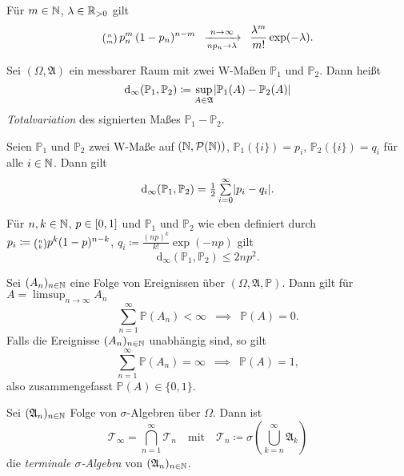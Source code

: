 \documentclass{cheat-sheet}
\newcommand{\Alg}{\mathfrak{A}} %
\renewcommand{\P}{\mathbb{P}} %
\let\myBinom\binom
\renewcommand{\binom}[2]{\mathsmaller{\myBinom{#1}{#2}}}
\begin{document}

\begin{satz}
  Für $m \in \mathbb{N}$, $\lambda \in \mathbb{R}_{>0}$ gilt
  \[ \binom{n}{m} \, p_n^m \, (1-p_n)^{n-m} \enspace \xrightarrow[n p_n \to \lambda]{n \to \infty} \enspace \frac{\lambda^m}{m!} \exp(-\lambda). \]
\end{satz}



\begin{defn}
  Sei $(\Omega, \Alg)$ ein messbarer Raum mit zwei W-Maßen $\P_1$ und $\P_2$. Dann heißt
  \[ \mathrm{d}_\infty(\P_1, \P_2) \coloneqq \sup_{A \in \Alg} \abs{\P_1(A) - \P_2(A)} \]
  \emph{Totalvariation} des signierten Maßes $\P_1 - \P_2$.
\end{defn}

\begin{satz}
  Seien $\P_1$ und $\P_2$ zwei W-Maße auf $(\mathbb{N}, \mathcal{P}(\mathbb{N}))$, $\P_1(\{ i \}) = p_i$, $\P_2(\{ i \}) = q_i$ für alle $i \in \mathbb{N}$. Dann gilt
  \[ \mathrm{d}_\infty(\P_1, \P_2) = \tfrac{1}{2} \sum_{i=0}^\infty \abs{p_i - q_i}. \]
\end{satz}

\begin{lem}
  Für $n, k \in \mathbb{N}$, $p \in \left[ 0, 1 \right]$ und $\P_1$ und $\P_2$ wie eben definiert durch $p_i \coloneqq \binom{n}{k} p^k (1-p)^{n-k}$, $q_i \coloneqq \tfrac{(np)^k}{k!} \exp(-np)$ gilt
  \[ \mathrm{d}_\infty(\P_1, \P_2) \leq 2 n p^2. \]
\end{lem}


\begin{lem}
  Sei $(A_n)_{n \in \mathbb{N}}$ eine Folge von Ereignissen über $(\Omega, \Alg, \P)$. Dann gilt für $A = \limsup_{n \to \infty} A_n$
  \[ \sum_{n=1}^\infty \P(A_n) < \infty \enspace \implies \enspace \P(A) = 0. \]
  Falls die Ereignisse $(A_n)_{n \in \mathbb{N}}$ unabhängig sind, so gilt
  \[ \sum_{n=1}^\infty \P(A_n) = \infty \enspace \implies \enspace \P(A) = 1, \]
  also zusammengefasst $\P(A) \in \{ 0, 1 \}$.
\end{lem}

\begin{defn}
  Sei $(\Alg_n)_{n \in \N}$ Folge von $\sigma$-Algebren über $\Omega$. Dann ist
  \[ \mathcal{T}_\infty = \bigcap_{n=1}^\infty \mathcal{T}_n \quad \text{mit} \quad \mathcal{T}_n \coloneqq \sigma \left( \bigcup_{k=n}^\infty \Alg_k \right) \]
  die \emph{terminale $\sigma$-Algebra} von $(\Alg_n)_{n \in \N}$.
\end{defn}
\end{document}
